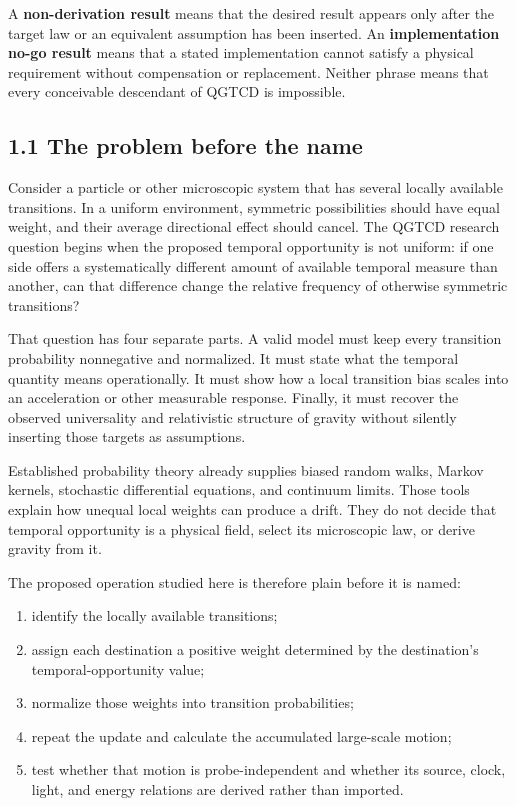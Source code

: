 \documentclass[
  american,
  11pt,
  letterpaper,
]{article}
\providecommand{\tightlist}{%
  \setlength{\itemsep}{0pt}\setlength{\parskip}{0pt}}
\begin{document}
A \textbf{non-derivation result} means that the desired result appears only after the target law or an equivalent assumption has been inserted. An \textbf{implementation no-go result} means that a stated implementation cannot satisfy a physical requirement without compensation or replacement. Neither phrase means that every conceivable descendant of QGTCD is impossible.

\subsection{1.1 The problem before the name}\label{the-problem-before-the-name}

Consider a particle or other microscopic system that has several locally available transitions. In a uniform environment, symmetric possibilities should have equal weight, and their average directional effect should cancel. The QGTCD research question begins when the proposed temporal opportunity is not uniform: if one side offers a systematically different amount of available temporal measure than another, can that difference change the relative frequency of otherwise symmetric transitions?

That question has four separate parts. A valid model must keep every transition probability nonnegative and normalized. It must state what the temporal quantity means operationally. It must show how a local transition bias scales into an acceleration or other measurable response. Finally, it must recover the observed universality and relativistic structure of gravity without silently inserting those targets as assumptions.

Established probability theory already supplies biased random walks, Markov kernels, stochastic differential equations, and continuum limits. Those tools explain how unequal local weights can produce a drift. They do not decide that temporal opportunity is a physical field, select its microscopic law, or derive gravity from it.

The proposed operation studied here is therefore plain before it is named:

\begin{enumerate}
\def\labelenumi{\arabic{enumi}.}
\tightlist
\item
  identify the locally available transitions;
\item
  assign each destination a positive weight determined by the destination's temporal-opportunity value;
\item
  normalize those weights into transition probabilities;
\item
  repeat the update and calculate the accumulated large-scale motion;
\item
  test whether that motion is probe-independent and whether its source, clock, light, and energy relations are derived rather than imported.
\end{enumerate}
\end{document}
